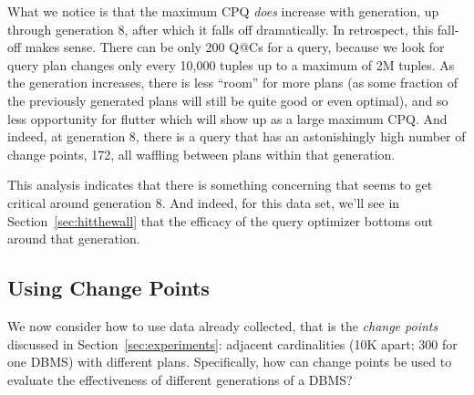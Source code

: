 \documentclass[prodmode,acmtods]{acmsmall}
\begin{document}
\begin{table}[h]
\end{table}

What we notice is that the maximum CPQ {\em does} increase with generation,
up through generation 8, after which it falls off dramatically. In
retrospect, this fall-off makes sense. There can be only 200 Q@Cs for a
query, because we look for query plan changes only every 10,000 tuples up to
a maximum of 2M tuples. As the generation increases, there is less ``room''
for more plans (as some fraction of the previously generated plans will
still be quite good or even optimal), and so less opportunity for flutter
which will show up as a large maximum CPQ. And indeed, at generation 8,
there is a query that has an astonishingly high number of change points,
172, all waffling between plans within that generation.

This analysis indicates that there is something concerning that seems to get
critical around generation 8.  And indeed, for this data set, we'll see in
Section~\ref{sec:hitthewall} that the efficacy of the query optimizer
bottoms out around that generation.

\subsection{Using Change Points}\label{sec:usingCP}
We now consider how to use data already collected, that is the {\em change
  points} discussed in Section~\ref{sec:experiments}: adjacent
cardinalities (10K apart; 300 for one \hbox{DBMS}) with different
plans. Specifically, how can change points be used to evaluate the
effectiveness of different generations of a \hbox{DBMS}?
\end{document}
